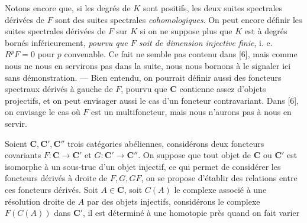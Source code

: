 Notons encore que, si les degrés de $K$ sont positifs, les deux suites
spectrales dérivées de $F$ sont des suites spectrales \textit{cohomologiques}.
On peut encore définir les suites spectrales dérivées de $F$ sur $K$ si on ne
suppose plus que $K$ est à degrés bornés inférieurement, \textit{pourvu que
$F$ soit de dimension injective finie}, i. e. $R^pF=0$ pour $p$ convenable. Ce
fait ne semble pas contenu dans [6], mais comme nous ne nous en servirons pas
dans la suite, nous nous bornons à le signaler ici sans démonstration. --- Bien
entendu, on pourrait définir aussi des foncteurs spectraux dérivés à gauche de
$F$, pourvu que $\mathbf{C}$ contienne assez d'objets projectifs, et on peut envisager
aussi le cas d'un foncteur contravariant. Dans [6], on envisage le cas où $F$
est un multifoncteur, mais nous n'aurons pas à nous en servir.

Soient $\mathbf{C},\mathbf{C}',\mathbf{C}''$ trois catégories abéliennes, considérons deux foncteurs
covariants $F:\mathbf{C}\to \mathbf{C}'$ et $G:\mathbf{C}'\to \mathbf{C}''$. On suppose
que tout objet de $\mathbf{C}$ ou $\mathbf{C}'$ est isomorphe à un sous-truc d'un objet injectif,
ce qui permet de considérer les foncteurs dérivés à droite de $F,G,GF$, on se
propose d'établir des relations entre ces foncteurs dérivés. Soit $A\in \mathbf{C}$,
soit $C(A)$ le complexe associé à une résolution droite de $A$ par des objets
injectifs, considérons le complexe $F(C(A))$ dans $\mathbf{C}'$, il est déterminé à une
homotopie près quand on fait varier

